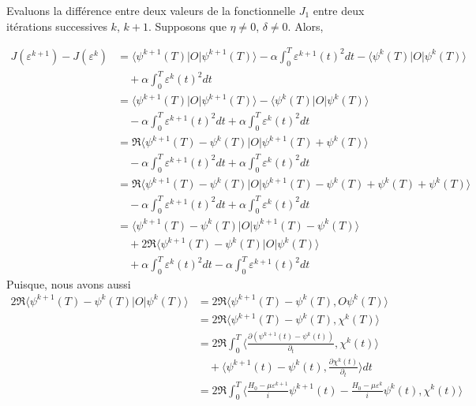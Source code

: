 \begin{ proof }
Evaluons la différence entre deux valeurs de la fonctionnelle $J_1$ entre deux itérations successives $k$, $k+1$. Supposons que $\eta \neq 0$, $\delta \neq 0$. Alors,

\begin{align*}
J(\varepsilon^{k+1})-J(\varepsilon^{k}) &= \langle \psi^{k+1}(T)|O| \psi^{k+1}(T) \rangle-\alpha \int_{0}^{T} \varepsilon^{k+1}(t)^2 dt - \langle \psi^{k}(T)|O| \psi^{k}(T) \rangle\\
&\quad + \alpha \int_{0}^{T} \varepsilon^{k}(t)^2 dt \\
&= \langle \psi^{k+1}(T)|O| \psi^{k+1}(T) \rangle - \langle \psi^{k}(T)|O| \psi^{k}(T) \rangle\\
&\quad -\alpha \int_{0}^{T} \varepsilon^{k+1}(t)^2 dt + \alpha \int_{0}^{T} \varepsilon^{k}(t)^2 dt \\
&= \Re\langle \psi^{k+1}(T) - \psi^{k}(T)|O| \psi^{k+1}(T) + \psi^{k}(T) \rangle\\
&\quad -\alpha \int_{0}^{T} \varepsilon^{k+1}(t)^2 dt + \alpha \int_{0}^{T} \varepsilon^{k}(t)^2 dt \\
&= \Re\langle \psi^{k+1}(T) - \psi^{k}(T)|O| \psi^{k+1}(T) - \psi^{k}(T)+ \psi^{k}(T)+ \psi^{k}(T) \rangle\\
&\quad -\alpha \int_{0}^{T} \varepsilon^{k+1}(t)^2 dt + \alpha \int_{0}^{T} \varepsilon^{k}(t)^2 dt \\
&=\langle \psi^{k+1}(T)-\psi^{k}(T)|O| \psi^{k+1}(T)-\psi^{k}(T)\rangle \\
&\quad +2\Re \langle \psi^{k+1}(T)-\psi^{k}(T)|O|\psi^{k}(T)\rangle\\ 
&\quad +\alpha \int_{0}^{T} \varepsilon^{k}(t)^2 dt-\alpha\int_{0}^{T} \varepsilon^{k+1}(t)^2 dt
\end{align*}
Puisque, nous avons aussi
\begin{align*}
2\Re \langle \psi^{k+1}(T)-\psi^{k}(T)|O|\psi^{k}(T)\rangle &= 2\Re \langle \psi^{k+1}(T)-\psi^{k}(T), O\psi^{k}(T)\rangle\\
&= 2\Re \langle \psi^{k+1}(T)-\psi^{k}(T), \chi^{k}(T)\rangle\\
&= 2\Re \int_{0}^{T} \langle \frac{\partial (\psi^{k+1}(t)-\psi^{k}(t))}{\partial_{t}}, \chi^{k}(t) \rangle\\
&\quad + \langle \psi^{k+1}(t)-\psi^{k}(t), \frac{\partial \chi^{k}(t)}{\partial_{t}} \rangle dt\\
&= 2\Re \int_{0}^{T} \langle \frac{H_0-\mu \varepsilon^{k+1}}{i}\psi^{k+1}(t) - \frac{H_0-\mu \varepsilon^{k}}{i}\psi^{k}(t), \chi^{k}(t) \rangle\\

\end{align*}
\end{ proof }
